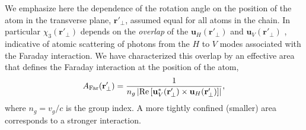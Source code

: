 \documentclass[aps,pra,twocolumn,superscriptaddress]{revtex4-1} %
\newcommand{\mbf}[1]{\mathbf{#1}}
\newcommand{\AF}{A_{\rm Far}} %
\begin{document}
We emphasize here the dependence of the rotation angle on the position of the atom in the transverse plane, $\mbf{r}'_\perp$, assumed equal for all atoms in the chain.  In particular $\chi_3(\mbf{r}'_\perp)$ depends on the {\em overlap} of the $\mbf{u}_H (\mbf{r}'_\perp)$ and $\mbf{u}_V (\mbf{r}'_\perp)$ , indicative of atomic scattering of photons from the $H$ to $V$ modes associated with the Faraday interaction.  We have characterized this overlap by an effective area that defines the Faraday interaction at the position of the atom,
\begin{equation}
\AF(\mbf{r}'_\perp) = \frac{1}{n_g \left\vert \text{Re} \left[ \mbf{u}^*_V (\mbf{r}'_\perp) \times \mbf{u}_H (\mbf{r}'_\perp) \right]\right\vert},
\end{equation}
where $n_g = v_g/c$ is the group index.  A more tightly confined (smaller) area corresponds to a stronger interaction.
\end{document}
